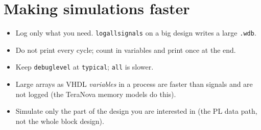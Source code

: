 \documentclass[11pt,a4paper]{article}
\newcommand{\code}[1]{\texttt{#1}}
\renewcommand{\_}{\oldunderscore\allowbreak{}}
\begin{document}
\section{Making simulations faster}
\begin{itemize}[nosep]
  \item Log only what you need. \code{log\_all\_signals} on a big design writes a large \code{.wdb}.
  \item Do not print every cycle; count in variables and print once at the end.
  \item Keep \code{debug\_level} at \code{typical}; \code{all} is slower.
  \item Large arrays as VHDL \emph{variables} in a process are faster than signals and are not logged (the TeraNova memory models do this).
  \item Simulate only the part of the design you are interested in (the PL data path, not the whole block design).
\end{itemize}

\clearpage
\end{document}
